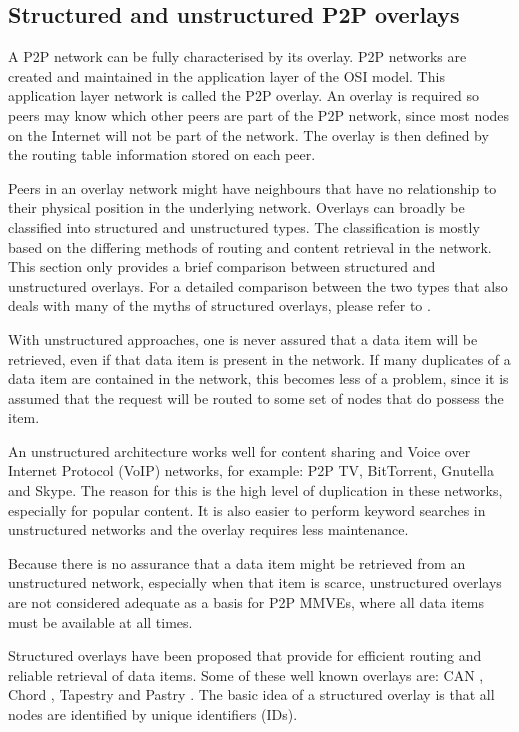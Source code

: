 \subsection{Structured and unstructured P2P overlays}
\label{overlays}

A P2P network can be fully characterised by its overlay. P2P networks are created and maintained in the application layer of the OSI model. This application layer network is called the P2P overlay. An overlay is required so peers may know which other peers are part of the P2P network, since most nodes on the Internet will not be part of the network. The overlay is then defined by the routing table information stored on each peer.

Peers in an overlay network might have neighbours that have no relationship to their physical position in the underlying network. Overlays can broadly be classified into structured and unstructured types. The classification is mostly based on the differing methods of routing and content retrieval in the network. This section only provides a brief comparison between structured and unstructured overlays. For a detailed comparison between the two types that also deals with many of the myths of structured overlays, please refer to \cite{Castro_structured_overlay_myths}.

With unstructured approaches, one is never assured that a data item will be retrieved, even if that data item is present in the network. If many duplicates of a data item are contained in the network, this becomes less of a problem, since it is assumed that the request will be routed to some set of nodes that do  possess the item.

An unstructured architecture works well for content sharing and Voice over Internet Protocol (VoIP) networks, for example: P2P TV, BitTorrent, Gnutella and Skype. The reason for this is the high level of duplication in these networks, especially for popular content. It is also easier to perform keyword searches in unstructured networks and the overlay requires less maintenance.

Because there is no assurance that a data item might be retrieved from an unstructured network, especially when that item is scarce, unstructured overlays are not considered adequate as a basis for P2P MMVEs, where all data items must be available at all times.

Structured overlays have been proposed that provide for efficient routing and reliable retrieval of data items. Some of these well known overlays are: CAN \cite{CAN}, Chord \cite{chord}, Tapestry \cite{tapestry} and Pastry \cite{pastry}. The basic idea of a structured overlay is that all nodes are identified by unique identifiers (IDs).

